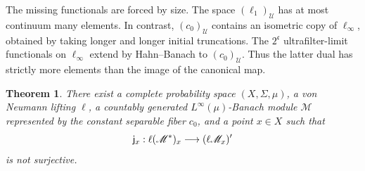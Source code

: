 \documentclass[11pt]{amsart}
\newtheorem{theorem}{Theorem}
\newcommand{\U}{\mathcal U}
\begin{document}
The missing functionals are forced by size.  The space $(\ell_1)_\U$ has at
most continuum many elements.  In contrast, $(c_0)_\U$ contains an isometric
copy of $\ell_\infty$, obtained by taking longer and longer initial
truncations.  The $2^{\mathfrak c}$ ultrafilter-limit functionals on
$\ell_\infty$ extend by Hahn--Banach to $(c_0)_\U$.  Thus the latter dual has
strictly more elements than the image of the canonical map.

\begin{theorem}\label{thm:counterexample}
There exist a complete probability space $(X,\Sigma,\mu)$, a von Neumann
lifting $\ell$, a countably generated $L^\infty(\mu)$-Banach module
$\mathscr M$ represented by the constant separable fiber $c_0$, and a point
$x\in X$ such that
\[
  {\sf j}_x:\ell(\mathscr M^*)_x\longrightarrow(\ell\mathscr M_x)'
\]
is not surjective.
\end{theorem}
\end{document}
